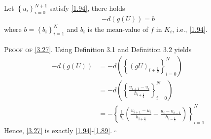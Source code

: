 \documentclass[a4paper]{article}
\numberwithin{equation}{section}
\begin{document}
Let $\left\{ {{u_i}} \right\}_{i = 0}^{N + 1}$ satisfy \eqref{1.94}, there holds
\begin{align}
\label{3.27}
 - d\left( {g\left( U \right)} \right) = b
\end{align}  
where $b = \left\{ {{b_i}} \right\}_{i = 1}^N$ and $b_i$ is the mean-value of $f$ in $K_i$, i.e., \eqref{1.94}.\\
\\
\textsc{Proof of \eqref{3.27}.} Using Definition 3.1 and Definition 3.2 yields
\begin{align}
 - d\left( {g\left( U \right)} \right) &=  - d\left( {\left\{ {{{\left( {gU} \right)}_{i + \frac{1}{2}}}} \right\}_{i = 0}^N} \right)\\
 &=  - d\left( {\left\{ {\frac{{{u_{i + 1}} - {u_i}}}{{{h_{i + \frac{1}{2}}}}}} \right\}_{i = 0}^N} \right)\\
 &=  - \left\{ {\frac{1}{{{h_i}}}\left( {\frac{{{u_{i + 1}} - {u_i}}}{{{h_{i + \frac{1}{2}}}}} - \frac{{{u_i} - {u_{i - 1}}}}{{{h_{i - \frac{1}{2}}}}}} \right)} \right\}_{i = 1}^N
\end{align}
Hence, \eqref{3.27} is exactly \eqref{1.94}-\eqref{1.89}. \hfill $\square$\\
\end{document}
